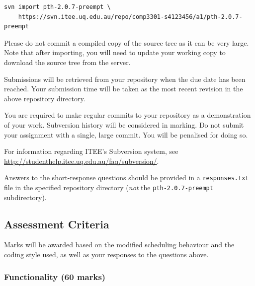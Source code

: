 \documentclass[12pt,a4paper]{article}
\begin{document}
\begin{verbatim}
svn import pth-2.0.7-preempt \
    https://svn.itee.uq.edu.au/repo/comp3301-s4123456/a1/pth-2.0.7-preempt
\end{verbatim}

Please do not commit a compiled copy of the source tree as it can be very
large. Note that after importing, you will need to update your working copy to
download the source tree from the server.

Submissions will be retrieved from your repository when the due date has been
reached.  Your submission time will be taken as the most recent revision in the
above repository directory.

You are required to make regular commits to your repository as a demonstration
of your work. Subversion history will be considered in marking. Do not submit
your assignment with a single, large commit. You will be penalised for doing
so.

For information regarding ITEE's Subversion system, see
\url{http://studenthelp.itee.uq.edu.au/faq/subversion/}.

Answers to the short-response questions should be provided in a
\texttt{responses.txt} file in the specified repository directory (\textit{not}
the \texttt{pth-2.0.7-preempt} subdirectory).

\clearpage
\subsection*{Assessment Criteria}

Marks will be awarded based on the modified scheduling behaviour and the coding
style used, as well as your responses to the questions above.

\subsubsection*{Functionality (60 marks)}
\end{document}
